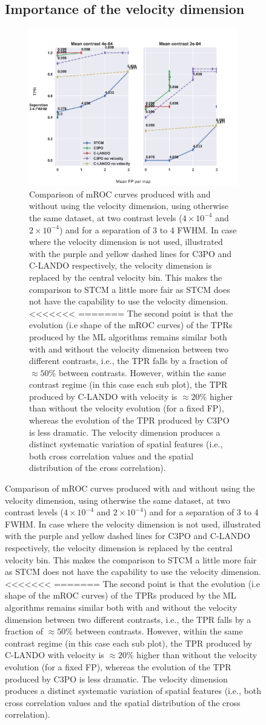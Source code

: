 \documentclass{aa}
\begin{document}
{{{\begin{figure}
{\subsection{Importance of the velocity dimension}

\begin{figure}
    \centering
    \includegraphics[width=\textwidth]{Fig6_final_September.png}
    \caption{Comparison of mROC curves produced with and without using the velocity dimension, using otherwise the same dataset, at two contrast levels ($4\times 10^{-4}$ and $2\times 10^{-4}$) and for a separation of 3 to 4 FWHM. In case where the velocity dimension is not used, illustrated with the purple and yellow dashed lines for C3PO and C-LANDO respectively, the velocity dimension is replaced by the central velocity bin. This makes the comparison to STCM a little more fair as STCM does not have the capability to use the velocity dimension.
<<<<<<<
=======
The second point is that the evolution (i.e shape of the mROC curves) of the TPRs produced by the ML algorithms remains similar both with and without the velocity dimension between two different contrasts, i.e., the TPR falls by a fraction of $\approx 50\%$ between contrasts.
However, within the same contrast regime (in this case each sub plot), the TPR produced by C-LANDO with velocity is $\approx 20\%$ higher than without the velocity evolution (for a fixed FP), whereas the evolution of the TPR produced by C3PO is less dramatic.
The velocity dimension produces a distinct systematic variation of spatial features (i.e., both cross correlation values and the spatial distribution of the cross correlation).
}
\end{figure}}
\end{figure}}}}
\end{document}

